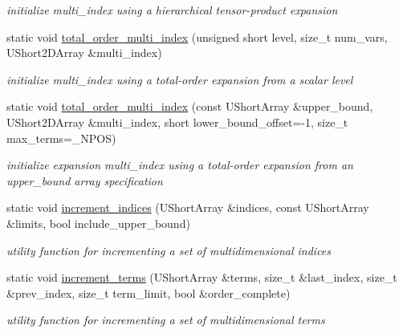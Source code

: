 \begin{DoxyCompactItemize}
\begin{DoxyCompactList}\small\item\em initialize multi\+\_\+index using a hierarchical tensor-\/product expansion \end{DoxyCompactList}\item 
static void \hyperlink{classPecos_1_1SharedPolyApproxData_ab240156f58f5303888effff0a2aec3c5}{total\+\_\+order\+\_\+multi\+\_\+index} (unsigned short level, size\+\_\+t num\+\_\+vars, U\+Short2\+D\+Array \&multi\+\_\+index)
\begin{DoxyCompactList}\small\item\em initialize multi\+\_\+index using a total-\/order expansion from a scalar level \end{DoxyCompactList}\item 
static void \hyperlink{classPecos_1_1SharedPolyApproxData_aea697f22f70fcd0f2573a2bfca69f985}{total\+\_\+order\+\_\+multi\+\_\+index} (const U\+Short\+Array \&upper\+\_\+bound, U\+Short2\+D\+Array \&multi\+\_\+index, short lower\+\_\+bound\+\_\+offset=-\/1, size\+\_\+t max\+\_\+terms=\+\_\+\+N\+P\+OS)\label{classPecos_1_1SharedPolyApproxData_aea697f22f70fcd0f2573a2bfca69f985}

\begin{DoxyCompactList}\small\item\em initialize expansion multi\+\_\+index using a total-\/order expansion from an upper\+\_\+bound array specification \end{DoxyCompactList}\item 
static void \hyperlink{classPecos_1_1SharedPolyApproxData_ae1b7fcd06394ddd85ad49801ffff2a08}{increment\+\_\+indices} (U\+Short\+Array \&indices, const U\+Short\+Array \&limits, bool include\+\_\+upper\+\_\+bound)\label{classPecos_1_1SharedPolyApproxData_ae1b7fcd06394ddd85ad49801ffff2a08}

\begin{DoxyCompactList}\small\item\em utility function for incrementing a set of multidimensional indices \end{DoxyCompactList}\item 
static void \hyperlink{classPecos_1_1SharedPolyApproxData_a1865d95a6055f2f72a4e2ac8b21a6616}{increment\+\_\+terms} (U\+Short\+Array \&terms, size\+\_\+t \&last\+\_\+index, size\+\_\+t \&prev\+\_\+index, size\+\_\+t term\+\_\+limit, bool \&order\+\_\+complete)\label{classPecos_1_1SharedPolyApproxData_a1865d95a6055f2f72a4e2ac8b21a6616}

\begin{DoxyCompactList}\small\item\em utility function for incrementing a set of multidimensional terms \end{DoxyCompactList}\end{DoxyCompactItemize}
